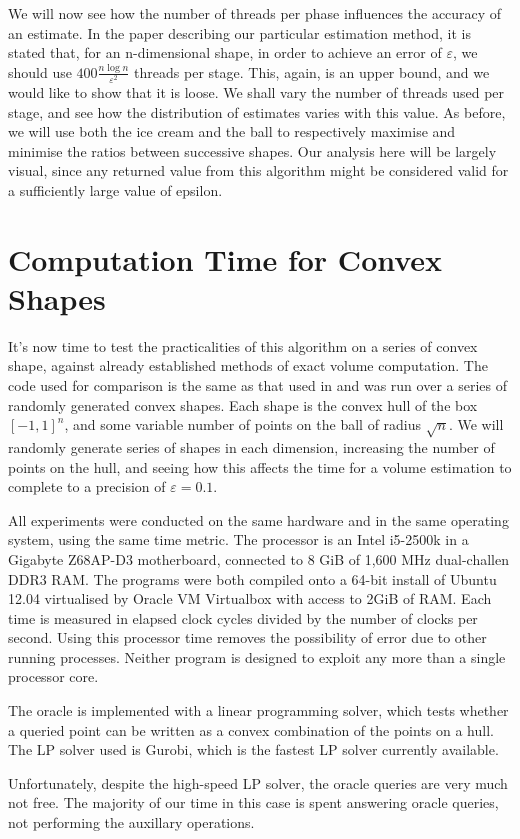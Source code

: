 We will now see how the number of threads per phase influences the accuracy of an estimate. In the paper describing our particular estimation method, it is stated that, for an n-dimensional shape, in order to achieve an error of $\varepsilon$, we should use $400\frac{n\log n}{\varepsilon^2}$ threads per stage. This, again, is an upper bound, and we would like to show that it is loose. We shall vary the number of threads used per stage, and see how the distribution of estimates varies with this value. As before, we will use both the ice cream and the ball to respectively maximise and minimise the ratios between successive shapes. Our analysis here will be largely visual, since any returned value from this algorithm might be considered valid for a sufficiently large value of epsilon.


\section{Computation Time for Convex Shapes}\label{sec_time}

It's now time to test the practicalities of this algorithm on a series of convex shape, against already established methods of exact volume computation. The code used for comparison is the same as that used in %
and was run over a series of randomly generated convex shapes. Each shape is the convex hull of the box $[-1,1]^n$, and some variable number of points on the ball of radius $\sqrt n$. We will randomly generate series of shapes in each dimension, increasing the number of points on the hull, and seeing how this affects the time for a volume estimation to complete to a precision of $\varepsilon = 0.1$.

All experiments were conducted on the same hardware and in the same operating system, using the same time metric. The processor is an Intel i5-2500k in a Gigabyte Z68AP-D3 motherboard, connected to 8 GiB of 1,600 MHz dual-challen DDR3 RAM. The programs were both compiled onto a 64-bit install of Ubuntu 12.04 virtualised by Oracle VM Virtualbox with access to 2GiB of RAM. Each time is measured in elapsed clock cycles divided by the number of clocks per second. Using this processor time removes the possibility of error due to other running processes. Neither program is designed to exploit any more than a single processor core.

The oracle is implemented with a linear programming solver, which tests whether a queried point can be written as a convex combination of the points on a hull. The LP solver used is Gurobi, which is the fastest LP solver currently available.


Unfortunately, despite the high-speed LP solver, the oracle queries are very much not free. The majority of our time in this case is spent answering oracle queries, not performing the auxillary operations. %
